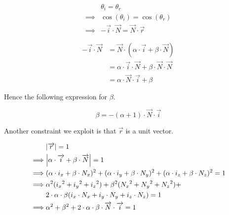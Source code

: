 \begin{equation} \begin{split}
& \theta_i = \theta_r \\
\implies & \cos(\theta_i) = \cos(\theta_r) \\
\implies & - \overrightarrow{i} \cdot \overrightarrow{N} =
       \overrightarrow{N} \cdot \overrightarrow{r}
\end{split} \end{equation}

\begin{equation} \begin{split}
- \overrightarrow{i} \cdot \overrightarrow{N} &=
\overrightarrow{N} \cdot
(\alpha \cdot \overrightarrow{i} + \beta \cdot \overrightarrow{N}) \\
&= \alpha \cdot \overrightarrow{i} \cdot \overrightarrow{N} +
   \beta \cdot \overrightarrow{N} \cdot \overrightarrow{N} \\
&= \alpha \cdot \overrightarrow{N} \cdot \overrightarrow{i} + \beta
\end{split} \end{equation}

Hence the following expression for $\beta$.

\begin{equation} \label{eq:reflect-beta-expr}
\beta = - (\alpha + 1) \cdot \overrightarrow{N} \cdot \overrightarrow{i}
\end{equation}

Another constraint we exploit is that $\overrightarrow{r}$ is a unit vector.

\begin{equation} \begin{split}
& \abs{\overrightarrow{r}} = 1 \\
\implies& \abs{\alpha \cdot \overrightarrow{i} +
                \beta \cdot \overrightarrow{N}} = 1 \\
\implies& (\alpha \cdot i_x + \beta \cdot N_x)^2 +
          (\alpha \cdot i_y + \beta \cdot N_y)^2 +
          (\alpha \cdot i_z + \beta \cdot N_z)^2 = 1 \\
\implies& \alpha^2 ({i_x}^2 + {i_y}^2 + {i_z}^2) +
          \beta^2 ({N_x}^2 + {N_y}^2 + {N_z}^2) + \\
          &2 \cdot \alpha \cdot \beta 
          (i_x \cdot N_x + i_y \cdot N_y + i_z \cdot N_z) = 1 \\
\implies& \alpha^2 + \beta^2 + 2 \cdot \alpha \cdot \beta \cdot
          \overrightarrow{N} \cdot \overrightarrow{i} = 1
\end{split} \end{equation}

